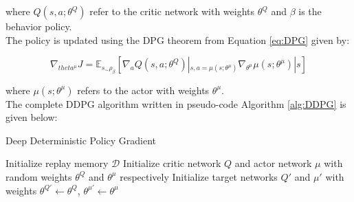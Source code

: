 where $Q(s, a; \theta^Q)$ refer to the critic network with weights $\theta^Q$ and $\beta$ is the behavior policy.
\\
\indent The policy is updated using the DPG theorem from Equation \ref{eq:DPG} given by:

\begin{equation}
	\label{eq:DPG_actorcritic_gradient}
	\nabla_{theta^\mu}J = \mathbb{E}_{s_\sim\rho_\beta}[\nabla_aQ(s, a; \theta^Q)|_{s, a=\mu(s;\theta^\mu)}\nabla_{\theta^\mu}\mu(s; \theta^\mu)|s]
\end{equation}

where $\mu(s; \theta^\mu)$ refers to the actor with weights $\theta^\mu$.
\\
\indent The complete DDPG algorithm written in pseudo-code Algorithm \ref{alg:DDPG} is given below:

\begin{algorithm}[h!]
	\caption{Deep Deterministic Policy Gradient}
	\label{alg:DDPG}
	\SetAlgoLined
	\DontPrintSemicolon
	Initialize replay memory $\mathcal{D}$ \;
	Initialize critic network $Q$ and actor network $\mu$ with random weights $\theta^Q$ and $\theta^\mu$ respectively \;
	Initialize target networks $Q'$ and $\mu'$ with weights $\theta^{Q'} \leftarrow \theta^Q$, $\theta^{\mu'} \leftarrow \theta^\mu$
\end{algorithm}



